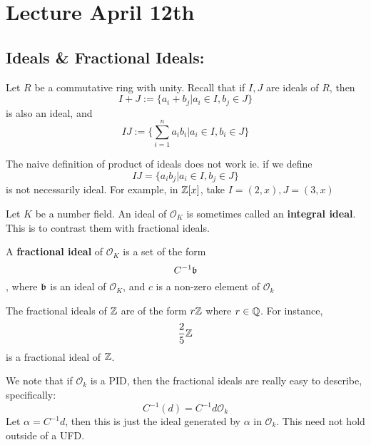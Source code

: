 \section{Lecture April 12th}

\subsection{Ideals & Fractional Ideals:}

\begin{definition}
Let $R$ be a commutative ring with unity. Recall that if $I, J$ are ideals of $R$, then 
\[I + J := \{a_i + b_j | a_i \in I, b_j \in J\}\]
is also an ideal, and
\[IJ := \{\sum_{i = 1}^n a_ib_i | a_i \in I, b_i \in J\}\]
\end{definition}

\begin{remark}
The naive definition of product of ideals does not work ie. if we define
\[IJ = \{a_ib_j | a_i \in I, b_j \in J\}\]
is not necessarily ideal. For example, in $\mathbb{Z}[x]$, take $I = (2, x), J = (3, x)$
\end{remark}

\begin{definition}
Let $K$ be a number field. An ideal of $\mathcal{O}_K$ is sometimes called an \textbf{integral ideal}. This is to contrast them with fractional ideals.
\end{definition}

\begin{definition}
A \textbf{fractional ideal} of $\mathcal{O}_K$ is a set of the form
\[C^{-1}\mathfrak{b}\]
, where $\mathfrak{b}$ is an ideal of $\mathcal{O}_K$, and $c$ is a non-zero element of $\mathcal{O}_k$
\end{definition}

\begin{example}
The fractional ideals of $\mathbb{Z}$ are of the form $r\mathbb{Z}$ where $r \in \mathbb{Q}$. For instance,
\[\frac{2}{5} \mathbb{Z}\]
is a fractional ideal of $\mathbb{Z}$.
\end{example}

\begin{remark}
We note that if $\mathcal{O}_k$ is a PID, then the fractional ideals are really easy to describe, specifically:
\[C^{-1}(d) = C^{-1}d \mathcal{O}_k\]
Let $\alpha = C^{-1} d$, then this is just the ideal generated by $\alpha$ in $\mathcal{O}_k$. This need not hold outside of a UFD.
\end{remark}

